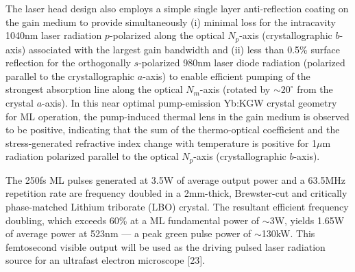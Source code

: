 The laser head design also employs a simple single layer  anti-reflection coating on the gain medium to provide simultaneously (i) minimal loss for the intracavity 1040nm laser radiation $p$-polarized along the optical $N_p$-axis (crystallographic $b$-axis) associated with the largest gain bandwidth and (ii) less than 0.5\% surface reflection for the orthogonally $s$-polarized 980nm laser diode radiation (polarized parallel to the crystallographic $a$-axis) to enable efficient pumping of the strongest absorption line along the optical $N_m$-axis (rotated by $\sim20^\circ$ from the crystal $a$-axis).
In this near optimal pump-emission Yb:KGW crystal geometry for ML operation, the pump-induced thermal lens in the gain medium is observed to be positive, indicating that the sum of the thermo-optical coefficient and the stress-generated refractive index change with temperature is positive for 1$\mu$m radiation polarized parallel to the optical $N_p$-axis (crystallographic $b$-axis).

The 250fs ML pulses generated at 3.5W of average output power and a 63.5MHz repetition rate are frequency doubled in a 2mm-thick, Brewster-cut and critically phase-matched Lithium triborate (LBO) crystal.
The resultant efficient frequency doubling, which exceeds 60\% at a ML fundamental power of $\sim$3W, yields 1.65W of average power at 523nm ---
a peak green pulse power of $\sim$130kW.
This femtosecond visible output will be used as the driving pulsed laser radiation source for an ultrafast electron microscope [23].

